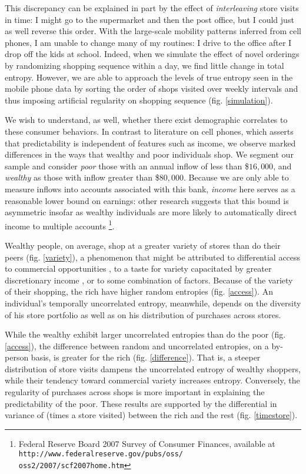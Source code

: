 \documentclass[twocolumn,floatfix]{revtex4}
\begin{document}
This discrepancy can be explained in part by the effect of {\it interleaving} store visits in time: I might go to the supermarket and then the post office, but I could just as well reverse this order. With the large-scale mobility patterns inferred from cell phones, I am unable to change many of my routines: I drive to the office after I drop off the kids at school. Indeed, when we simulate the effect of novel orderings by randomizing shopping sequence within a day, we find little change in total entropy. However, we are able to approach the levels of true entropy seen in the mobile phone data by sorting the order of shops visited over weekly intervals and thus imposing artificial regularity on shopping sequence (fig. \ref{simulation}).




We wish to understand, as well, whether there exist demographic correlates to these consumer behaviors. In contrast to literature on cell phones, which asserts that predictability is independent of features such as income, we observe marked differences in the ways that wealthy and poor individuals shop. We segment our sample and consider {\it poor} those with an annual inflow of less than \$$16,000$, and {\it wealthy} as those with inflow greater than \$$80,000$. Because we are only able to measure inflows into accounts associated with this bank, {\it income} here serves as a reasonable lower bound on earnings: other research suggests that this bound is asymmetric insofar as wealthy individuals are more likely to automatically direct income to multiple accounts \footnote{Federal Reserve Board 2007 Survey of Consumer Finances, available at {\tt http://www.federalreserve.gov/pubs/oss/\\oss2/2007/scf2007home.htm}}.




Wealthy people, on average, shop at a greater variety of stores than do their peers (fig. \ref{variety}), a phenomenon that might be attributed to differential access to commercial opportunities \cite{powell2007food}, to a taste for variety capacitated by greater discretionary income \cite{wood2005discretionary}, or to some combination of factors.  Because of the variety of their shopping, the rich have higher random entropies (fig. \ref{access}). An individual's temporally uncorrelated entropy, meanwhile, depends on the diversity of his store portfolio as well as on his distribution of purchases across stores.  

While the wealthy exhibit larger uncorrelated entropies than do the poor (fig. \ref{access}), the difference between random and uncorrelated entropies, on a by-person basis, is greater for the rich (fig. \ref{difference}). That is, a steeper distribution of store visits dampens the uncorrelated entropy of wealthy shoppers, while their tendency toward commercial variety increases entropy. Conversely, the regularity of purchases across shops is more important in explaining the predictability of the poor. These results are supported by the differential in variance of (times a store visited) between the rich and the rest (fig. \ref{timestore}).
 
\end{document}
